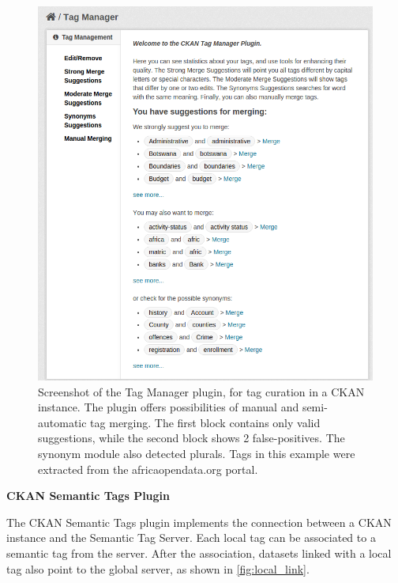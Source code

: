 \begin{figure}[h]
\begin{center}
\includegraphics[width=\columnwidth]{images/local_curation.png}
\caption[Screenshot of the Tag Manager plugin.]{Screenshot of the Tag Manager plugin, for tag curation in a CKAN instance. The plugin offers possibilities of manual and semi-automatic tag merging. The first block contains only valid suggestions, while the second block shows 2 false-positives. The synonym module also detected plurals. Tags in this example were extracted from the africaopendata.org portal.}
\label{fig:local_curation}
\end{center}
\end{figure}

\noindent\textbf{CKAN Semantic Tags Plugin}

The CKAN Semantic Tags plugin implements the connection between a CKAN instance and the Semantic Tag Server.
Each local tag can be associated to a semantic tag from the server.
After the association, datasets linked with a local tag also point to the global server, as shown in \autoref{fig:local_link}.

